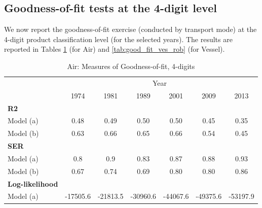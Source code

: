 \documentclass[a4paper,11pt]{article}
\begin{document}
\subsection{Goodness-of-fit tests at the 4-digit level}

We now report the goodness-of-fit exercise (conducted by transport mode) at the 4-digit product classification level (for the selected years).
The results are reported in Tables \ref{tab:good_fit_air_rob} (for Air) and \ref{tab:good_fit_ves_rob} (for Vessel).
\begin{table}[htbp]
  \centering
  \caption{Air: Measures of Goodness-of-fit, 4-digits}
\begin{center}
\label{tab:good_fit_air_rob}%
  \footnotesize{
\begin{tabular}{l|cccccc}
\hline
\hline
      & \multicolumn{6}{c}{Year}              \\
      & \multicolumn{1}{c}{1974} & \multicolumn{1}{c}{1981} & \multicolumn{1}{c}{1989} & \multicolumn{1}{c}{2001} & \multicolumn{1}{c}{2009} & \multicolumn{1}{c}{2013}  \\
\hline
\textbf{R2} & \multicolumn{1}{c}{} & \multicolumn{1}{c}{} & \multicolumn{1}{c}{} &       &       &      \\
Model (a)& \multicolumn{1}{c}{0.48} & \multicolumn{1}{c}{0.49} & \multicolumn{1}{c}{0.50} & \multicolumn{1}{c}{0.50} & \multicolumn{1}{c}{0.45} & \multicolumn{1}{c}{0.35} \\
Model (b) & \multicolumn{1}{c}{0.63} & \multicolumn{1}{c}{0.66} & \multicolumn{1}{c}{0.65} & \multicolumn{1}{c}{0.66} & \multicolumn{1}{c}{0.54} & \multicolumn{1}{c}{0.45} \\
\textbf{SER} & \multicolumn{1}{c}{} & \multicolumn{1}{c}{} & \multicolumn{1}{c}{} &       & \multicolumn{1}{c}{} & \multicolumn{1}{c}{}  \\
Model (a)& \multicolumn{1}{c}{0.8} & \multicolumn{1}{c}{0.9} & \multicolumn{1}{c}{0.83} &   0.87    & \multicolumn{1}{c}{0.88} & \multicolumn{1}{c}{0.93}  \\
Model (b) & \multicolumn{1}{c}{0.67} & \multicolumn{1}{c}{0.74} & \multicolumn{1}{c}{0.69} &  0.80     & \multicolumn{1}{c}{0.80} & \multicolumn{1}{c}{0.86}  \\
\textbf{Log-likelihood} & \multicolumn{1}{c}{} & \multicolumn{1}{c}{} & \multicolumn{1}{c}{} &       & \multicolumn{1}{c}{} & \multicolumn{1}{c}{} \\
Model (a) & \multicolumn{1}{c}{-17505.6} & \multicolumn{1}{c}{-21813.5} & \multicolumn{1}{c}{-30960.6} & \multicolumn{1}{c}{-44067.6} & \multicolumn{1}{c}{-49375.6} & \multicolumn{1}{c}{-53197.9}  \\

\end{tabular}}
\end{center}
\end{table}
\end{document}

